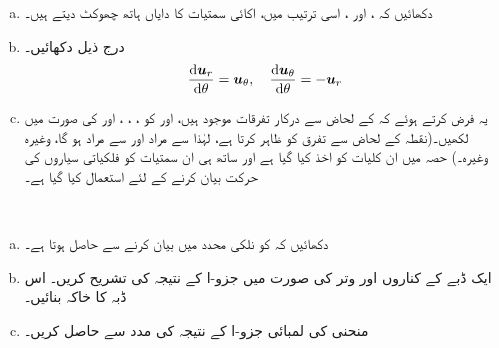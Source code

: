 \begin{enumerate}[a.]
\item
دکھائیں کہ ،  اور ، اسی ترتیب میں، اکائی سمتیات کا دایاں ہاتھ چھوکٹ  دیتے ہیں۔
\item
درج ذیل دکھائیں۔
\begin{align*}
\frac{\dif\kvec{u}_r}{\dif\theta}=\kvec{u}_{\theta},\quad \frac{\dif\kvec{u}_{\theta}}{\dif \theta}=-\kvec{u}_r
\end{align*}
\item
یہ فرض کرتے ہوئے  کہ  کے لحاض سے درکار تفرقات موجود ہیں،  اور  کو ، ، ،  اور  کی صورت میں لکھیں۔(نقطہ  کے لحاض سے تفرق کو ظاہر کرتا ہے، لہٰذا  سے مراد  اور  سے مراد  ہو گا، وغیرہ وغیرہ۔)  حصہ  میں ان کلیات کو اخذ کیا گیا ہے  اور ساتھ ہی ان سمتیات کو فلکیاتی سیاروں کی حرکت بیان کرنے کے لئے استعمال کیا گیا ہے۔
\end{enumerate}
\\
\begin{enumerate}[a.]
\item
دکھائیں کہ   کو نلکی محدد میں بیان کرنے سے  حاصل ہوتا ہے۔
\item
ایک ڈبے  کے کناروں اور وتر  کی صورت میں جزو-ا کے نتیجہ  کی تشریح کریں۔ اس ڈبہ کا خاکہ بنائیں۔
\item
منحنی  کی لمبائی جزو-ا کے نتیجہ کی مدد  سے حاصل کریں۔
\end{enumerate}


